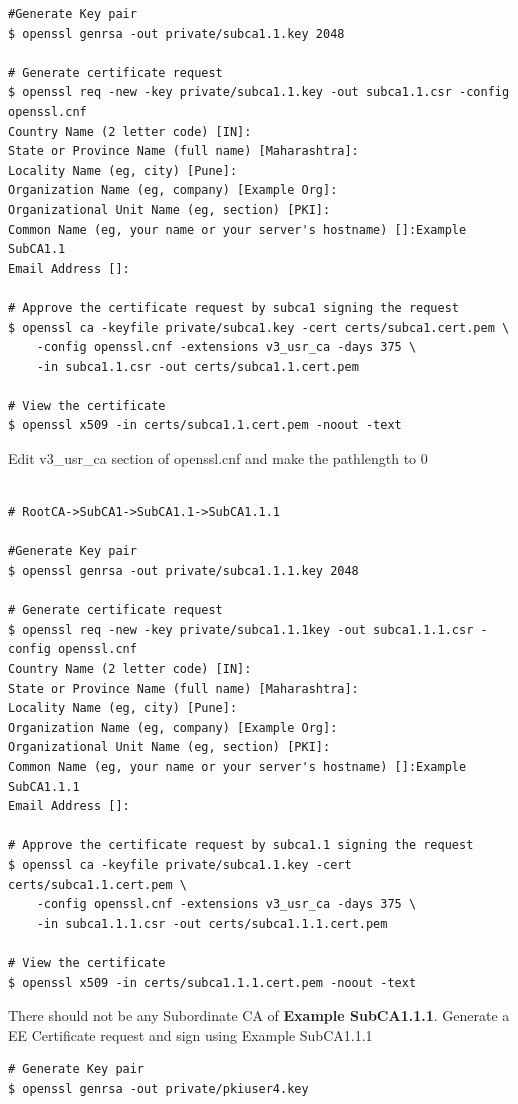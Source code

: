 \documentclass[a4paper]{article}
\begin{document}
\begin{enumerate}[label*=\arabic*.]
\begin{lstlisting}[style=bashInputStyle]
#Generate Key pair 
$ openssl genrsa -out private/subca1.1.key 2048

# Generate certificate request
$ openssl req -new -key private/subca1.1.key -out subca1.1.csr -config openssl.cnf
Country Name (2 letter code) [IN]:
State or Province Name (full name) [Maharashtra]:
Locality Name (eg, city) [Pune]:
Organization Name (eg, company) [Example Org]:
Organizational Unit Name (eg, section) [PKI]:
Common Name (eg, your name or your server's hostname) []:Example SubCA1.1
Email Address []:

# Approve the certificate request by subca1 signing the request
$ openssl ca -keyfile private/subca1.key -cert certs/subca1.cert.pem \
    -config openssl.cnf -extensions v3_usr_ca -days 375 \
    -in subca1.1.csr -out certs/subca1.1.cert.pem

# View the certificate 
$ openssl x509 -in certs/subca1.1.cert.pem -noout -text
        \end{lstlisting}
        Edit v3\_usr\_ca section of openssl.cnf and make the pathlength to 0
        \begin{lstlisting}[style=bashInputStyle]

# RootCA->SubCA1->SubCA1.1->SubCA1.1.1

#Generate Key pair 
$ openssl genrsa -out private/subca1.1.1.key 2048

# Generate certificate request
$ openssl req -new -key private/subca1.1.1key -out subca1.1.1.csr -config openssl.cnf
Country Name (2 letter code) [IN]:
State or Province Name (full name) [Maharashtra]:
Locality Name (eg, city) [Pune]:
Organization Name (eg, company) [Example Org]:
Organizational Unit Name (eg, section) [PKI]:
Common Name (eg, your name or your server's hostname) []:Example SubCA1.1.1
Email Address []:

# Approve the certificate request by subca1.1 signing the request
$ openssl ca -keyfile private/subca1.1.key -cert certs/subca1.1.cert.pem \
    -config openssl.cnf -extensions v3_usr_ca -days 375 \
    -in subca1.1.1.csr -out certs/subca1.1.1.cert.pem

# View the certificate 
$ openssl x509 -in certs/subca1.1.1.cert.pem -noout -text
        \end{lstlisting}
        There should not be any Subordinate CA of \textbf{Example SubCA1.1.1}. Generate 
        a EE Certificate request and sign using Example SubCA1.1.1
        \begin{lstlisting}[style=bashInputStyle]
# Generate Key pair
$ openssl genrsa -out private/pkiuser4.key


\end{lstlisting}
\end{enumerate}
\end{document}
